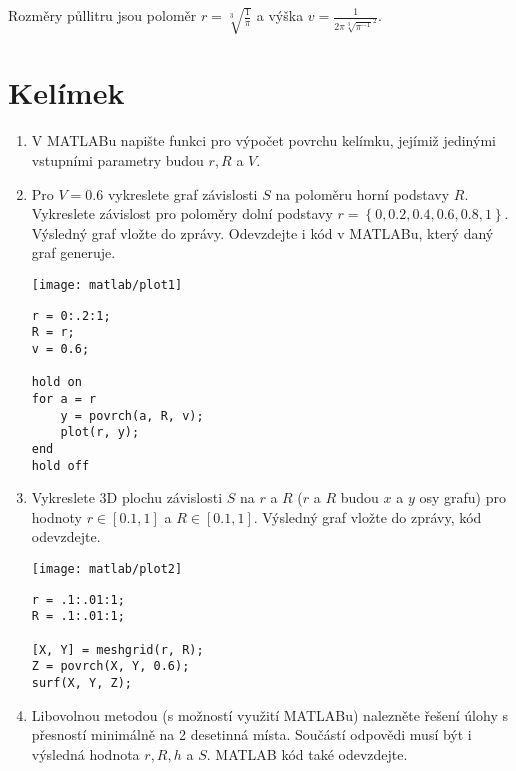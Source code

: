 Rozměry půllitru jsou poloměr \( r = \sqrt[3]{\frac{1}{\pi}} \) a výška \( v = \frac{1}{2 \pi \sqrt[3]{\pi^{-1}}^2} \).

\newpage

\section{Kelímek}

\begin{enumerate}
    \item V MATLABu napište funkci pro výpočet povrchu kelímku, jejímiž jedinými vstupními parametry budou \( r, R \) a \( V \).
    
    
    
    \item Pro \( V = 0.6 \) vykreslete graf závislosti \( S \) na poloměru horní podstavy \( R \). Vykreslete závislost pro poloměry dolní podstavy \( r = \left\{ 0, 0.2, 0.4, 0.6, 0.8, 1 \right\} \). Výsledný graf vložte do zprávy. Odevzdejte i kód v MATLABu, který daný graf generuje.

    \begin{center}
    \texttt{[image: matlab/plot1]}
    \end{center}
    
    \begin{lstlisting}
r = 0:.2:1;
R = r;
v = 0.6;
        
hold on
for a = r
    y = povrch(a, R, v);
    plot(r, y);
end
hold off
    \end{lstlisting}
    
    \item Vykreslete 3D plochu závislosti \( S \) na \( r \) a \( R \) (\( r \) a \( R \) budou \( x \) a \( y \) osy grafu) pro hodnoty \( r \in \left[ 0.1, 1 \right] \) a \( R \in \left[ 0.1, 1 \right] \). Výsledný graf vložte do zprávy, kód odevzdejte.

    \begin{center}
        \texttt{[image: matlab/plot2]}
    \end{center}
    
    \begin{lstlisting}
r = .1:.01:1;
R = .1:.01:1;

[X, Y] = meshgrid(r, R);
Z = povrch(X, Y, 0.6);
surf(X, Y, Z);
    \end{lstlisting}
    
    \item Libovolnou metodou (s možností využití MATLABu) nalezněte řešení úlohy s přesností minimálně na 2 desetinná místa. Součástí odpovědi musí být i výsledná hodnota \( r, R, h \) a \( S \). MATLAB kód také odevzdejte.


\end{enumerate}
